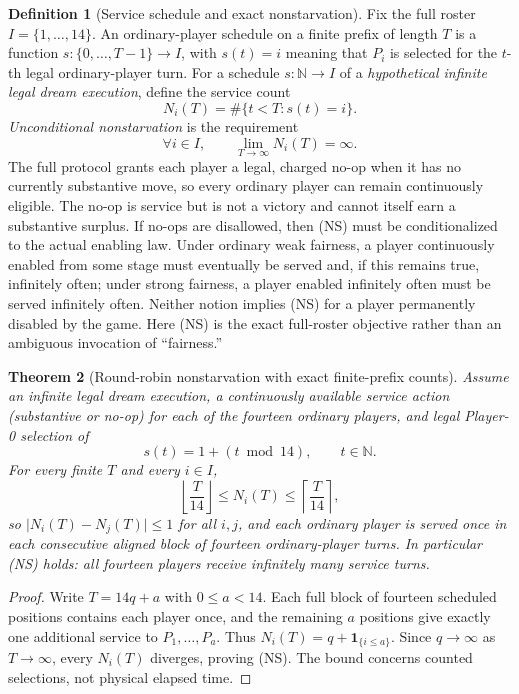 \documentclass[11pt,letterpaper]{article}
\theoremstyle{definition}
\newtheorem{definition}{Definition}[section]
\theoremstyle{plain}
\newtheorem{theorem}[definition]{Theorem}
\theoremstyle{definition}
\begin{document}
\begin{definition}[Service schedule and exact nonstarvation]
Fix the full roster $I=\{1,\ldots,14\}$. An ordinary-player schedule on a finite prefix of length $T$ is a function $s:\{0,\ldots,T-1\}\to I$, with $s(t)=i$ meaning that $P_i$ is selected for the $t$-th legal ordinary-player turn. For a schedule $s:\mathbb N\to I$ of a \emph{hypothetical infinite legal dream execution}, define the service count
\[
N_i(T)=\#\{t<T:s(t)=i\}.
\]
\emph{Unconditional nonstarvation} is the requirement
\[
\forall i\in I,\qquad \lim_{T\to\infty}N_i(T)=\infty.\tag{NS}
\]
The full protocol grants each player a legal, charged no-op when it has no currently substantive move, so every ordinary player can remain continuously eligible. The no-op is service but is not a victory and cannot itself earn a substantive surplus. If no-ops are disallowed, then (NS) must be conditionalized to the actual enabling law. Under ordinary weak fairness, a player continuously enabled from some stage must eventually be served and, if this remains true, infinitely often; under strong fairness, a player enabled infinitely often must be served infinitely often. Neither notion implies (NS) for a player permanently disabled by the game. Here (NS) is the exact full-roster objective rather than an ambiguous invocation of ``fairness.''
\end{definition}

\begin{theorem}[Round-robin nonstarvation with exact finite-prefix counts]
Assume an infinite legal dream execution, a continuously available service action (substantive or no-op) for each of the fourteen ordinary players, and legal Player-0 selection of
\[
s(t)=1+(t\bmod 14),\qquad t\in\mathbb N.\tag{RR}
\]
For every finite $T$ and every $i\in I$,
\[
\left\lfloor\frac{T}{14}\right\rfloor
\le N_i(T)\le
\left\lceil\frac{T}{14}\right\rceil,
\]
so $\lvert N_i(T)-N_j(T)\rvert\le1$ for all $i,j$, and each ordinary player is served once in each consecutive aligned block of fourteen ordinary-player turns. In particular (NS) holds: all fourteen players receive infinitely many service turns.
\end{theorem}
\begin{proof}
Write $T=14q+a$ with $0\le a<14$. Each full block of fourteen scheduled positions contains each player once, and the remaining $a$ positions give exactly one additional service to $P_1,\ldots,P_a$. Thus $N_i(T)=q+\mathbf1_{\{i\le a\}}$. Since $q\to\infty$ as $T\to\infty$, every $N_i(T)$ diverges, proving (NS). The bound concerns counted selections, not physical elapsed time.
\end{proof}
\end{document}
